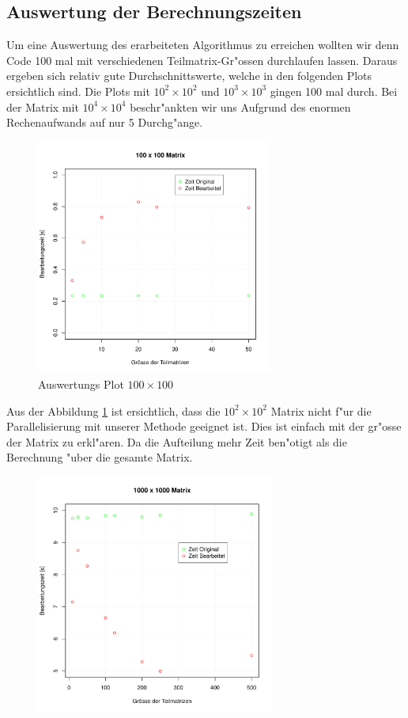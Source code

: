 \begin{refsection}
\subsection[Auswertung]{Auswertung der Berechnungszeiten}
Um eine Auswertung des erarbeiteten Algorithmus zu erreichen wollten wir denn Code 100 mal mit verschiedenen Teilmatrix-Gr"ossen durchlaufen lassen. Daraus ergeben sich relativ gute Durchschnittswerte, welche in den folgenden Plots ersichtlich sind. Die Plots mit $10^2\times10^2$ und $10^3\times10^3$ gingen 100 mal durch. Bei der Matrix mit $10^4\times10^4$ beschr"ankten wir uns Aufgrund des enormen Rechenaufwands auf nur 5 Durchg"ange.
\begin{figure}
\begin{center}
\includegraphics[width=0.69\textwidth]{./mapreduce/PC100.pdf}
\end{center}
\caption{Auswertungs Plot $100\times100$}
\label{q}
\end{figure}
Aus der Abbildung \ref{q} ist ersichtlich, dass die $10^2\times10^2$ Matrix nicht f"ur die Parallelisierung mit unserer Methode geeignet ist. Dies ist einfach mit der gr"osse der Matrix zu erkl"aren. Da die Aufteilung mehr Zeit ben"otigt als die Berechnung "uber die gesamte Matrix.
\begin{figure}
\begin{center}
\includegraphics[width=0.7\textwidth]{./mapreduce/PC1000.pdf}

\end{center}
\end{figure}
\end{refsection}
